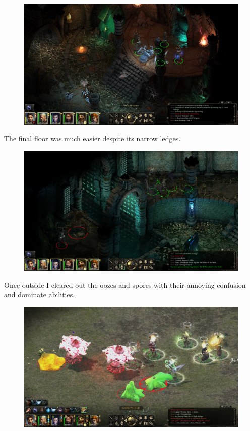 \documentclass{article}
\begin{document}
\begin{figure}
\includegraphics[scale=0.33]{files/blog/2019_03_04_pillars_of_eternity_path_of_the_damned_act_iii/2019_03_04_llearhemen_floor1.jpg}
\end{figure}

The final floor was much easier despite its narrow ledges.

\begin{figure}
\includegraphics[scale=0.33]{files/blog/2019_03_04_pillars_of_eternity_path_of_the_damned_act_iii/2019_03_04_llearhemen_floor2.jpg}
\end{figure}

Once outside I cleared out the oozes and spores with their annoying confusion and dominate abilities.

\begin{figure}
\includegraphics[scale=0.33]{files/blog/2019_03_04_pillars_of_eternity_path_of_the_damned_act_iii/2019_03_04_stormwall.jpg}
\end{figure}
\end{document}
